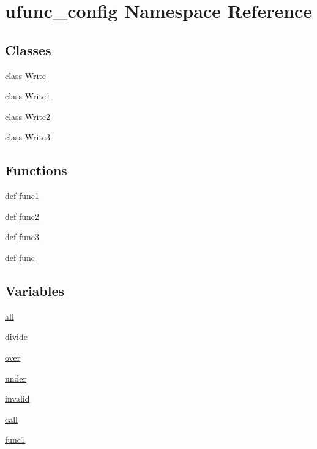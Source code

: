 \hypertarget{namespaceufunc__config}{}\section{ufunc\+\_\+config Namespace Reference}
\label{namespaceufunc__config}
\subsection*{Classes}
\begin{DoxyCompactItemize}
\item 
class \hyperlink{classufunc__config_1_1Write}{Write}
\item 
class \hyperlink{classufunc__config_1_1Write1}{Write1}
\item 
class \hyperlink{classufunc__config_1_1Write2}{Write2}
\item 
class \hyperlink{classufunc__config_1_1Write3}{Write3}
\end{DoxyCompactItemize}
\subsection*{Functions}
\begin{DoxyCompactItemize}
\item 
def \hyperlink{namespaceufunc__config_a7272e7f989bc7000cb528dfbf119b7eb}{func1}
\item 
def \hyperlink{namespaceufunc__config_a1378172851d8aa1659ba7098a2bb2fc5}{func2}
\item 
def \hyperlink{namespaceufunc__config_aae8fd3ab959a78f76cffa2e7543a6d83}{func3}
\item 
def \hyperlink{namespaceufunc__config_a1c463c1c3dd9c11b97230da590b6bd5f}{func}
\end{DoxyCompactItemize}
\subsection*{Variables}
\begin{DoxyCompactItemize}
\item 
\hyperlink{namespaceufunc__config_a6d3f78d2d9b9a060535e473d08e19944}{all}
\item 
\hyperlink{namespaceufunc__config_a3840b6a53bd0c20eda6168261620cb9d}{divide}
\item 
\hyperlink{namespaceufunc__config_a401fe72bce3930f99611afda7d63ecec}{over}
\item 
\hyperlink{namespaceufunc__config_a3076a764a33564e224a48c80e3883201}{under}
\item 
\hyperlink{namespaceufunc__config_aca5b3a9a13ea4607cc64024cbe1d8ca0}{invalid}
\item 
\hyperlink{namespaceufunc__config_a1f974f441646d40a0d5ca67319034ac7}{call}
\item 
\hyperlink{namespaceufunc__config_aa0cc1c826d9638a5b43691dde4e2a58a}{func1}
\end{DoxyCompactItemize}


